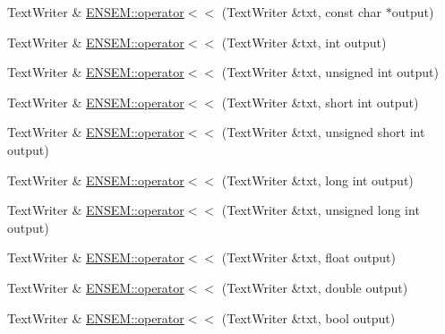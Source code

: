 \begin{DoxyCompactItemize}
\item 
Text\+Writer \& \mbox{\hyperlink{group__io_gaf097695886fb51a3d6c35f6b0bac14fc}{E\+N\+S\+E\+M\+::operator$<$$<$}} (Text\+Writer \&txt, const char $\ast$output)
\item 
Text\+Writer \& \mbox{\hyperlink{group__io_ga0dc2ec2539e29f2482b5e033daf6b013}{E\+N\+S\+E\+M\+::operator$<$$<$}} (Text\+Writer \&txt, int output)
\item 
Text\+Writer \& \mbox{\hyperlink{group__io_gafe8260aa83dc65480d323272a62f2ec0}{E\+N\+S\+E\+M\+::operator$<$$<$}} (Text\+Writer \&txt, unsigned int output)
\item 
Text\+Writer \& \mbox{\hyperlink{group__io_gab16e79cd4973872500ffbdacdc04be37}{E\+N\+S\+E\+M\+::operator$<$$<$}} (Text\+Writer \&txt, short int output)
\item 
Text\+Writer \& \mbox{\hyperlink{group__io_ga1d2f1326c7e1471ec11e3290bca05276}{E\+N\+S\+E\+M\+::operator$<$$<$}} (Text\+Writer \&txt, unsigned short int output)
\item 
Text\+Writer \& \mbox{\hyperlink{group__io_ga8d4e5827a00d9bf9fd96b669720052d1}{E\+N\+S\+E\+M\+::operator$<$$<$}} (Text\+Writer \&txt, long int output)
\item 
Text\+Writer \& \mbox{\hyperlink{group__io_gabb890a87f7dab1b0e731aaf8b8c3a681}{E\+N\+S\+E\+M\+::operator$<$$<$}} (Text\+Writer \&txt, unsigned long int output)
\item 
Text\+Writer \& \mbox{\hyperlink{group__io_ga0e07b49d2a54640fc8aa6cdeed40005a}{E\+N\+S\+E\+M\+::operator$<$$<$}} (Text\+Writer \&txt, float output)
\item 
Text\+Writer \& \mbox{\hyperlink{group__io_ga77263e95f4f5d264142cf805ef1fc01f}{E\+N\+S\+E\+M\+::operator$<$$<$}} (Text\+Writer \&txt, double output)
\item 
Text\+Writer \& \mbox{\hyperlink{group__io_ga4bb4e9f2c0da52dbce22280b6b00e35d}{E\+N\+S\+E\+M\+::operator$<$$<$}} (Text\+Writer \&txt, bool output)
\end{DoxyCompactItemize}
